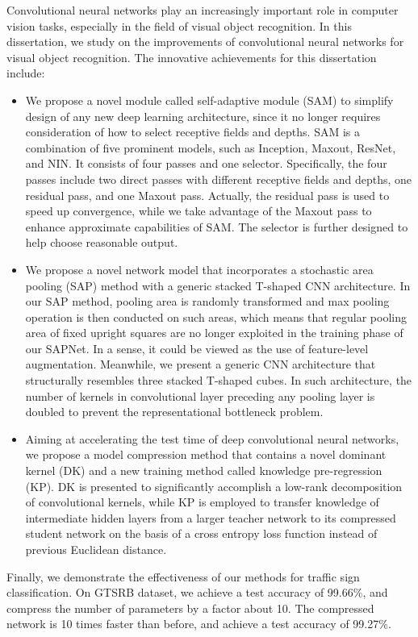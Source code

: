 \begin{eabstract}

Convolutional neural networks play an increasingly important role in computer vision tasks, especially in the field of visual object recognition. In this dissertation, we study on the improvements of convolutional neural networks for visual object recognition. The innovative achievements for this dissertation include:

  \begin{itemize}
    \item We propose a novel module called self-adaptive module (SAM) to simplify design of any new deep learning architecture, since it no longer requires consideration of how to select receptive fields and depths. SAM is a combination of five prominent models, such as Inception, Maxout, ResNet, and NIN. It consists of four passes and one selector. Specifically, the four passes include two direct passes with different receptive fields and depths, one residual pass, and one Maxout pass. Actually, the residual pass is used to speed up convergence, while we take advantage of the Maxout pass to enhance approximate capabilities of SAM. The selector is further designed to help choose reasonable output.
    \item We propose a novel network model that incorporates a stochastic area pooling (SAP) method with a generic stacked T-shaped CNN architecture. In our SAP method, pooling area is randomly transformed and max pooling operation is then conducted on such areas, which means that regular pooling area of fixed upright squares are no longer exploited in the training phase of our SAPNet. In a sense, it could be viewed as the use of feature-level augmentation. Meanwhile, we present a generic CNN architecture that structurally resembles three stacked T-shaped cubes. In such architecture, the number of kernels in convolutional layer preceding any pooling layer is doubled to prevent the representational bottleneck problem.
    \item Aiming at accelerating the test time of deep convolutional neural networks, we propose a model compression method that contains a novel dominant kernel (DK) and a new training method called knowledge pre-regression (KP). DK is presented to significantly accomplish a low-rank decomposition of convolutional kernels, while KP is employed to transfer knowledge of intermediate hidden layers from a larger teacher network to its compressed student network on the basis of a cross entropy loss function instead of previous Euclidean distance.
  \end{itemize}

Finally, we demonstrate the effectiveness of our methods for traffic sign classification. On GTSRB dataset, we achieve a test accuracy of 99.66\%, and compress the number of parameters by a factor about 10. The compressed network is 10 times faster than before, and achieve a test accuracy of 99.27\%.


\end{eabstract}

